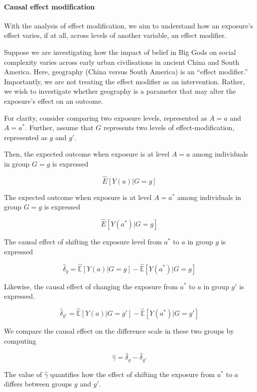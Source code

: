 \documentclass[
  singlecolumn]{article}
\let\oldparagraph\paragraph
\renewcommand{\paragraph}[1]{\oldparagraph{#1}\mbox{}}
\begin{document}
\hypertarget{causal-effect-modification}{%
\paragraph{\texorpdfstring{\textbf{Causal effect
modification}}{Causal effect modification}}\label{causal-effect-modification}}

With the analysis of effect modification, we aim to understand how an
exposure's effect varies, if at all, across levels of another variable,
an effect modifier.

Suppose we are investigating how the impact of belief in Big Gods on
social complexity varies across early urban civilisations in ancient
China and South America. Here, geography (China versus South America) is
an ``effect modifier.'' Importantly, we are not treating the effect
modifier as an intervention. Rather, we wish to investigate whether
geography is a parameter that may alter the exposure's effect on an
outcome.

For clarity, consider comparing two exposure levels, represented as
\(A = a\) and \(A= a^*\). Further, assume that \(G\) represents two
levels of effect-modification, represented as \(g\) and \(g'\).

Then, the expected outcome when exposure is at level \(A=a\) among
individuals in group \(G=g\) is expressed

\[\hat{E}[Y(a)|G=g]\]

The expected outcome when exposure is at level \(A=a^*\) among
individuals in group \(G=g\) is expressed

\[\hat{E}[Y(a^*)|G=g]\]

The causal effect of shifting the exposure level from \(a^*\) to \(a\)
in group \(g\) is expressed

\[\hat{\delta}_g = \hat{\mathbb{E}}[Y(a)|G=g] - \hat{\mathbb{E}}[Y(a^*)|G=g]\]

Likewise, the causal effect of changing the exposure from \(a^*\) to
\(a\) in group \(g'\) is expressed.

\[\hat{\delta}_{g'} = \hat{\mathbb{E}}[Y(a)|G=g'] - \hat{\mathbb{E}}[Y(a^*)|G=g']\]

We compare the causal effect on the difference scale in these two groups
by computing

\[\hat{\gamma} = \hat{\delta}_g - \hat{\delta}_{g'}\]

The value of \(\hat{\gamma}\) quantifies how the effect of shifting the
exposure from \(a^*\) to \(a\) differs between groups \(g\) and \(g'\).
\end{document}
